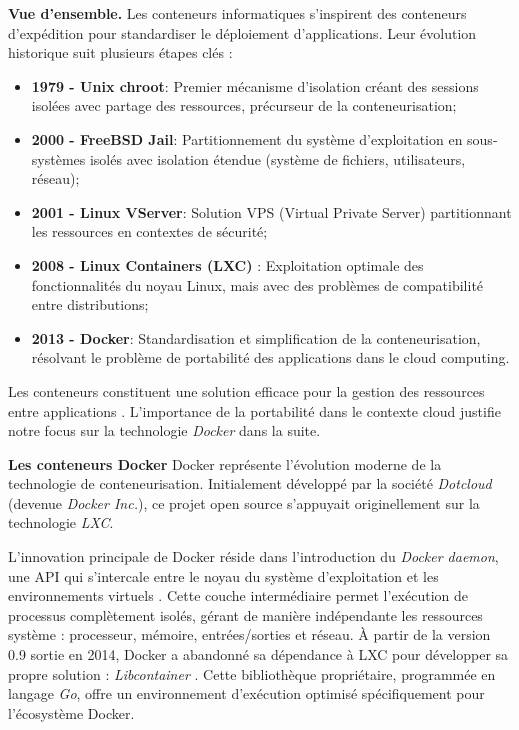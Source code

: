\textbf{Vue d'ensemble.}
Les conteneurs informatiques s'inspirent des conteneurs d'expédition pour standardiser le déploiement d'applications. Leur évolution historique suit plusieurs étapes clés :
\begin{itemize}
    \item \textbf{1979 - Unix chroot}: Premier mécanisme d'isolation créant des sessions isolées avec partage des ressources, précurseur de la conteneurisation;
    \item \textbf{2000 - FreeBSD Jail}: Partitionnement du système d'exploitation en sous-systèmes isolés avec isolation étendue (système de fichiers, utilisateurs, réseau);
    \item \textbf{2001 - Linux VServer}: Solution VPS (Virtual Private Server) partitionnant les ressources en contextes de sécurité;
    \item \textbf{2008 - Linux Containers (LXC)} : Exploitation optimale des fonctionnalités du noyau Linux, mais avec des problèmes de compatibilité entre distributions;
    \item \textbf{2013 - Docker}: Standardisation et simplification de la conteneurisation, résolvant le problème de portabilité des applications dans le cloud computing.
\end{itemize}
Les conteneurs constituent une solution efficace pour la gestion des ressources entre applications \cite{moga2016level}. L'importance de la portabilité dans le contexte cloud justifie notre focus sur la technologie \textit{Docker} dans la suite.

\textbf{Les conteneurs Docker}
Docker représente l'évolution moderne de la technologie de conteneurisation. Initialement développé par la société \textit{Dotcloud} (devenue \textit{Docker Inc.}), ce projet open source s'appuyait originellement sur la technologie \textit{LXC}.

L'innovation principale de Docker réside dans l'introduction du \textit{Docker daemon}, une API qui s'intercale entre le noyau du système d'exploitation et les environnements virtuels \cite{joy2015performance}. Cette couche intermédiaire permet l'exécution de processus complètement isolés, gérant de manière indépendante les ressources système : processeur, mémoire, entrées/sorties et réseau.
À partir de la version 0.9 sortie en 2014, Docker a abandonné sa dépendance à LXC pour développer sa propre solution : \textit{Libcontainer} \cite{bui2015analysis}. Cette bibliothèque propriétaire, programmée en langage \textit{Go}, offre un environnement d'exécution optimisé spécifiquement pour l'écosystème Docker.

